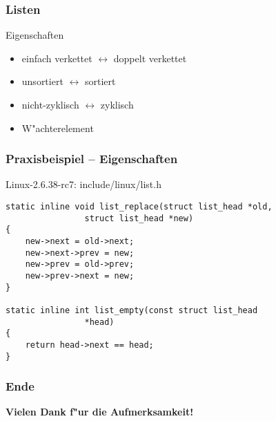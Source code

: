 \documentclass{beamer}
\begin{document}
\begin{frame}
\frametitle{Listen}
\begin{block}{Eigenschaften}
\begin{itemize}
\item einfach verkettet $\leftrightarrow$ doppelt verkettet
\item unsortiert $\leftrightarrow$ sortiert
\item nicht-zyklisch $\leftrightarrow$ zyklisch
\item W"achterelement
\end{itemize}
\end{block}
\end{frame}


\begin{frame}[containsverbatim]
\frametitle{Praxisbeispiel -- Eigenschaften}
\begin{block}{Linux-2.6.38-rc7: include/linux/list.h}
\begin{lstlisting}
static inline void list_replace(struct list_head *old,
				struct list_head *new)
{
	new->next = old->next;
	new->next->prev = new;
	new->prev = old->prev;
	new->prev->next = new;
}

static inline int list_empty(const struct list_head 
				*head)
{
	return head->next == head;
}
\end{lstlisting}
\end{block}
\end{frame}


\begin{frame}
\frametitle{Ende}
\begin{center}
\textbf{\Huge Vielen Dank f"ur die Aufmerksamkeit!}
\end{center}
\end{frame}
\end{document}
